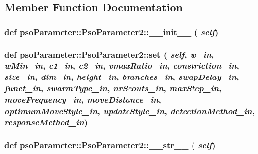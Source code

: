 \subsection{Member Function Documentation}
\hypertarget{classpsoParameter_1_1PsoParameter2_b8f10c9acd928da1898c60faad7efaff}{
\subsubsection{\setlength{\rightskip}{0pt plus 5cm}def psoParameter::PsoParameter2::\_\-\_\-init\_\-\_\- ( {\em self})}}
\label{classpsoParameter_1_1PsoParameter2_b8f10c9acd928da1898c60faad7efaff}


\hypertarget{classpsoParameter_1_1PsoParameter2_bf59429bc398c1e3147e2c4685024076}{
\subsubsection{\setlength{\rightskip}{0pt plus 5cm}def psoParameter::PsoParameter2::set ( {\em self}, \/   {\em w\_\-in}, \/   {\em wMin\_\-in}, \/   {\em c1\_\-in}, \/   {\em c2\_\-in}, \/   {\em vmaxRatio\_\-in}, \/   {\em constriction\_\-in}, \/   {\em size\_\-in}, \/   {\em dim\_\-in}, \/   {\em height\_\-in}, \/   {\em branches\_\-in}, \/   {\em swapDelay\_\-in}, \/   {\em funct\_\-in}, \/   {\em swarmType\_\-in}, \/   {\em nrScouts\_\-in}, \/   {\em maxStep\_\-in}, \/   {\em moveFrequency\_\-in}, \/   {\em moveDistance\_\-in}, \/   {\em optimumMoveStyle\_\-in}, \/   {\em updateStyle\_\-in}, \/   {\em detectionMethod\_\-in}, \/   {\em responseMethod\_\-in})}}
\label{classpsoParameter_1_1PsoParameter2_bf59429bc398c1e3147e2c4685024076}


\hypertarget{classpsoParameter_1_1PsoParameter2_2a23d184827809ac8044b243269d37cd}{
\subsubsection{\setlength{\rightskip}{0pt plus 5cm}def psoParameter::PsoParameter2::\_\-\_\-str\_\-\_\- ( {\em self})}}
\label{classpsoParameter_1_1PsoParameter2_2a23d184827809ac8044b243269d37cd}




